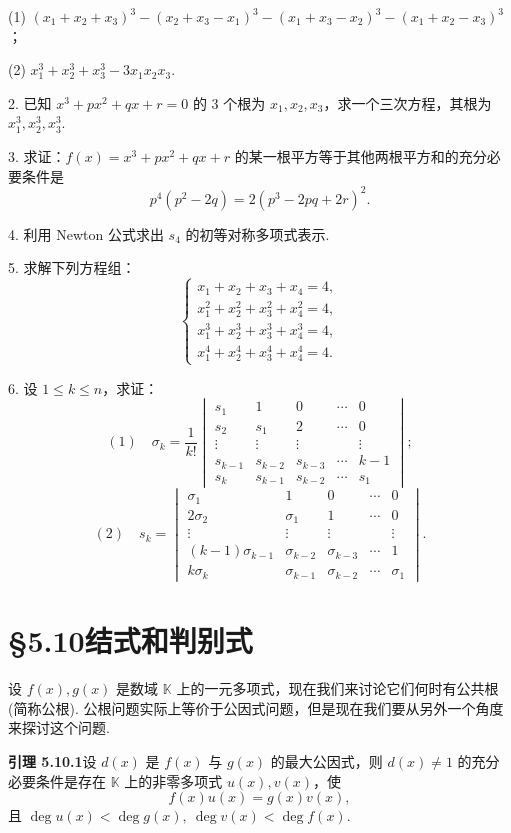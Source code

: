 \documentclass[UTF8, 12pt, fontset=fandol, oneside]{ctexart}
\begin{document}
(1) $(x_1+x_2+x_3)^3-(x_2+x_3-x_1)^3-(x_1+x_3-x_2)^3-(x_1+x_2-x_3)^3$；

(2) $x_1^3+x_2^3+x_3^3-3x_1x_2x_3$.

2. 已知 $x^3+px^2+qx+r=0$ 的 3 个根为 $x_1,x_2,x_3$，求一个三次方程，其根为 $x_1^3,x_2^3,x_3^3$.

3. 求证：$f(x)=x^3+px^2+qx+r$ 的某一根平方等于其他两根平方和的充分必要条件是
\[
p^4(p^2-2q)=2(p^3-2pq+2r)^2.
\]

4. 利用 Newton 公式求出 $s_4$ 的初等对称多项式表示.

5. 求解下列方程组：
\[
\begin{cases}
x_1+x_2+x_3+x_4=4,\\
x_1^2+x_2^2+x_3^2+x_4^2=4,\\
x_1^3+x_2^3+x_3^3+x_4^3=4,\\
x_1^4+x_2^4+x_3^4+x_4^4=4.
\end{cases}
\]

6. 设 $1\leq k\leq n$，求证：
\[
(1)\quad \sigma_k=\frac1{k!}
\begin{vmatrix}
s_1&1&0&\cdots&0\\
s_2&s_1&2&\cdots&0\\
\vdots&\vdots&\vdots&&\vdots\\
s_{k-1}&s_{k-2}&s_{k-3}&\cdots&k-1\\
s_k&s_{k-1}&s_{k-2}&\cdots&s_1
\end{vmatrix};
\]
\[
(2)\quad s_k=
\begin{vmatrix}
\sigma_1&1&0&\cdots&0\\
2\sigma_2&\sigma_1&1&\cdots&0\\
\vdots&\vdots&\vdots&&\vdots\\
(k-1)\sigma_{k-1}&\sigma_{k-2}&\sigma_{k-3}&\cdots&1\\
k\sigma_k&\sigma_{k-1}&\sigma_{k-2}&\cdots&\sigma_1
\end{vmatrix}.
\]

\section*{§5.10\quad 结式和判别式}

设 $f(x),g(x)$ 是数域 $\mathbb{K}$ 上的一元多项式，现在我们来讨论它们何时有公共根 (简称公根). 公根问题实际上等价于公因式问题，但是现在我们要从另外一个角度来探讨这个问题.

\noindent\textbf{引理 5.10.1}\quad 设 $d(x)$ 是 $f(x)$ 与 $g(x)$ 的最大公因式，则 $d(x)\neq 1$ 的充分必要条件是存在 $\mathbb{K}$ 上的非零多项式 $u(x),v(x)$，使
\begin{equation}
f(x)u(x)=g(x)v(x),
\tag{5.10.1}
\end{equation}
且 $\deg u(x)<\deg g(x),\ \deg v(x)<\deg f(x)$.
\end{document}

